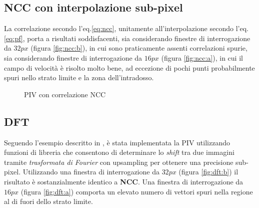 \documentclass[a4paper]{article}
\begin{document}
\subsection{NCC con interpolazione sub-pixel}

La correlazione secondo l'eq.\ref{eq:ncc}, unitamente all'interpolazione secondo l'eq.\ref{eq:pf}, porta a risultati soddisfacenti, sia considerando finestre di interrogazione da $32px$ (figura \ref{fig:ncc:b}), in cui sono praticamente assenti correlazioni spurie, sia considerando finestre di interrogazione da $16px$ (figura \ref{fig:ncc:a}), in cui il campo di velocità è risolto molto bene, ad eccezione di pochi punti probabilmente spuri nello strato limite e la zona dell'intradosso.

\begin{figure}[ht]
	\centering
	\caption{PIV con correlazione NCC}
	\label{fig:ncc}
\end{figure}


\subsection{DFT}

Seguendo l'esempio descritto in \cite{scikit}, è stata implementata la PIV utilizzando funzioni di libreria che consentono di determinare lo \textit{shift} tra due immagini tramite \textit{trasformata di Fourier} con upsampling per ottenere una precisione sub-pixel. Utilizzando una finestra di interrogazione da $32px$ (figura \ref{fig:dft:b}) il risultato è sostanzialmente identico a \textbf{NCC}. Una finestra di interrogazione da $16px$  (figura \ref{fig:dft:a}) comporta un elevato numero di vettori spuri nella regione al di fuori dello strato limite.
\end{document}
